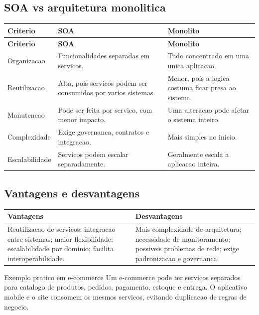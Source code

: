 \documentclass[12pt,a4paper]{article}
\begin{document}
\subsection{SOA vs arquitetura monolitica}

\begin{longtable}{@{}L{4cm}L{5.4cm}L{5.4cm}@{}}
\toprule
\textbf{Criterio} & \textbf{SOA} & \textbf{Monolito} \\
\midrule
\endfirsthead
\toprule
\textbf{Criterio} & \textbf{SOA} & \textbf{Monolito} \\
\midrule
\endhead
Organizacao & Funcionalidades separadas em servicos. & Tudo concentrado em uma unica aplicacao. \\
Reutilizacao & Alta, pois servicos podem ser consumidos por varios sistemas. & Menor, pois a logica costuma ficar presa ao sistema. \\
Manutencao & Pode ser feita por servico, com menor impacto. & Uma alteracao pode afetar o sistema inteiro. \\
Complexidade & Exige governanca, contratos e integracao. & Mais simples no inicio. \\
Escalabilidade & Servicos podem escalar separadamente. & Geralmente escala a aplicacao inteira. \\
\bottomrule
\end{longtable}

\subsection{Vantagens e desvantagens}

\begin{tabularx}{\textwidth}{@{}Y Y@{}}
\toprule
\textbf{Vantagens} & \textbf{Desvantagens} \\
\midrule
Reutilizacao de servicos; integracao entre sistemas; maior flexibilidade; escalabilidade por dominio; facilita interoperabilidade. &
Mais complexidade de arquitetura; necessidade de monitoramento; possiveis problemas de rede; exige padronizacao e governanca. \\
\bottomrule
\end{tabularx}

\begin{exemplo}{Exemplo pratico em e-commerce}
Um e-commerce pode ter servicos separados para catalogo de produtos, pedidos, pagamento, estoque e entrega. O aplicativo mobile e o site consomem os mesmos servicos, evitando duplicacao de regras de negocio.
\end{exemplo}
\end{document}
